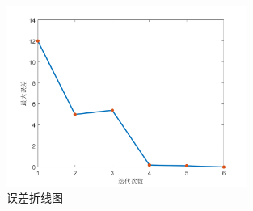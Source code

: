 \documentclass[12pt]{ctexart}
\begin{document}
\begin{spacing}{1.5}
\begin{figure}[H]
	\centering
	\includegraphics[width=0.7\textwidth]{误差折线图.png}
	\caption{误差折线图}
	\label{tu10}
\end{figure}


\end{spacing}
\end{document}

